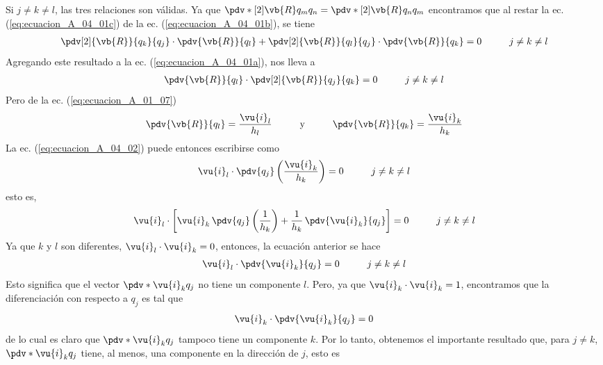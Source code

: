 Si $j \neq k \neq l$, las tres relaciones son válidas. Ya que $\pdv*[2]{\vb{R}}{q_{m}}{q_{n}} = \pdv*[2]{\vb{R}}{q_{n}}{q_{m}}$ encontramos que al restar la ec. (\ref{eq:ecuacion_A_04_01c}) de la ec. (\ref{eq:ecuacion_A_04_01b}), se tiene
\begin{align*}
\pdv[2]{\vb{R}}{q_{k}}{q_{j}} \cdot \pdv{\vb{R}}{q_{l}} + \pdv[2]{\vb{R}}{q_{l}}{q_{j}} \cdot \pdv{\vb{R}}{q_{k}} = 0 \hspace{1cm} j \neq k \neq l 
\end{align*}
Agregando este resultado a la ec. (\ref{eq:ecuacion_A_04_01a}), nos lleva a
\begin{align}
\pdv{\vb{R}}{q_{l}} \cdot \pdv[2]{\vb{R}}{q_{j}}{q_{k}} = 0 \hspace{1cm} j \neq k \neq l
\label{eq:ecuacion_A_04_02}    
\end{align}
Pero de la ec. (\ref{eq:ecuacion_A_01_07})
\begin{align*}
\pdv{\vb{R}}{q_{l}} = \dfrac{\vu{i}_{l}}{h_{l}} \hspace{1cm} \mbox{y} \hspace{1cm} \pdv{\vb{R}}{q_{k}} = \dfrac{\vu{i}_{k}}{h_{k}}
\end{align*}
La ec. (\ref{eq:ecuacion_A_04_02}) puede entonces escribirse como
\begin{align*}
\vu{i}_{l} \cdot \pdv{q_{j}} \left( \dfrac{\vu{i}_{k}}{h_{k}} \right) = 0 \hspace{1cm} j \neq k \neq l
\end{align*}
esto es,
\begin{align*}
\vu{i}_{l} \cdot \left[ \vu{i}_{k} \, \pdv{q_{j}} \left( \dfrac{1}{h_{k}} \right) + \dfrac{1}{h_{k}} \, \pdv{\vu{i}_{k}}{q_{j}} \right] = 0 \hspace{1cm} j \neq k \neq l
\end{align*}
Ya que $k$ y $l$ son diferentes, $\vu{i}_{l} \cdot \vu{i}_{k} = 0$, entonces, la ecuación anterior se hace
\begin{align*}
\vu{i}_{l} \cdot \pdv{\vu{i}_{k}}{q_{j}} = 0 \hspace{1cm} j \neq k \neq l
\end{align*}
Esto significa que el vector $\pdv*{\vu{i}_{k}}{q_{j}}$ no tiene un componente $l$. Pero, ya que $\vu{i}_k
 \cdot \vu{i}_{k} = 1$, encontramos que la diferenciación con respecto a $q_{j}$ es tal que
 \begin{align}
\vu{i}_{k} \cdot \pdv{\vu{i}_{k}}{q_{j}} = 0
\label{eq:ecuacion_A_04_03}     
\end{align}
de lo cual es claro que $\pdv*{\vu{i}_{k}}{q_{j}}$ tampoco tiene un componente $k$. Por lo tanto, obtenemos el importante resultado que, para $j \neq k$, $\pdv*{\vu{i}_{k}}{q_{j}}$ tiene, al menos, una componente en la dirección de $j$, esto es
